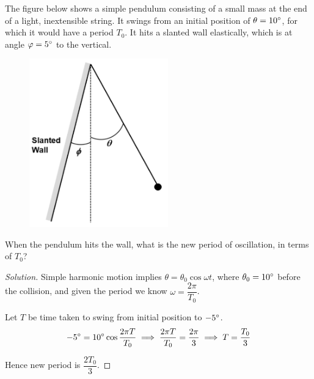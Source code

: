 \begin{prbm}
The figure below shows a simple pendulum consisting of a small mass at the end of a light, inextensible string. It swings from an initial position of $\theta=10\degree$, for which it would have a period $T_0$. It hits a slanted wall elastically, which is at angle $\varphi=5\degree$ to the vertical.

\begin{figure}[H]
    \centering
    \includegraphics[width=6cm]{images/pendulum_wall.png}
\end{figure}

When the pendulum hits the wall, what is the new period of oscillation, in terms of $T_0$?
\end{prbm}

\begin{proof}[Solution]
Simple harmonic motion implies $\theta = \theta_0 \cos \omega t$, where $\theta_0 = 10\degree$ before the collision, and given the period we know $\omega = \dfrac{2\pi}{T_0}$.

Let $T$ be time taken to swing from initial position to $-5\degree$.
\[ -5\degree = 10\degree \cos \frac{2\pi T}{T_0} \implies \frac{2\pi T}{T_0} = \frac{2\pi}{3} \implies T=\frac{T_0}{3} \]

Hence new period is $\boxed{\dfrac{2T_0}{3}}$.
\end{proof}

\pagebreak